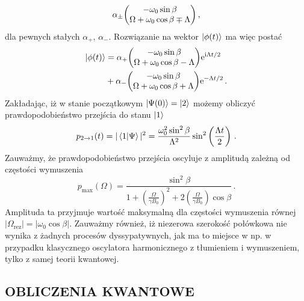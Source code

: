 \documentclass{myclass}
\begin{document}
\begin{itemize}
\begin{equation*}
        \alpha_\pm \mqty( -\omega_0\sin\beta \\ \Omega + \omega_0\cos\beta \mp \Lambda)\,,
    \end{equation*}
    dla pewnych stałych \(\alpha_+\), \(\alpha_-\). Rozwiązanie na wektor \(\ket{\phi(t)}\) ma więc
    postać
    \begin{equation*}
        \begin{split}
            \ket{\phi(t)} &= \alpha_+\mqty(-\omega_0\sin\beta \\ \Omega+\omega_0\cos\beta - \Lambda)\e^{\im\Lambda t/2} \\
            &+ \alpha_- \mqty(-\omega_0\sin\beta \\ \Omega + \omega_0\cos\beta+\Lambda)\e^{-\Lambda t/2}\,.
        \end{split}
    \end{equation*}
    Zakładając, iż w stanie początkowym \(\ket{\Psi(0)} = \ket{2}\) możemy obliczyć
    prawdopodobieństwo przejścia do stanu \(\ket{1}\)
    \begin{equation*}
        p_{2\to1}(t) = |\braket{1}{\Psi}|^2 = \frac{\omega_0^2\sin^2\beta}{\Lambda^2}\sin^2\left(\frac{\Lambda t}{2}\right)\,.
    \end{equation*}
    Zauważmy, że prawdopodobieństwo przejścia oscyluje z amplitudą zależną od częstości wymuszenia
    \begin{equation*}
        p_\text{max}(\Omega) = \frac{\sin^2\beta}{1 + \left(\frac{\Omega}{\gamma B_0}\right)^2 + 2\left(\frac{\Omega}{\gamma B_0}\right) \cos\beta} \,.
    \end{equation*}
    Amplituda ta przyjmuje wartość maksymalną dla częstości wymuszenia równej \(|\Omega_\text{rez}|
    = |\omega_0 \cos\beta|\). Zauważmy również, iż niezerowa szerokość połówkowa nie wynika z
    żadnych procesów dyssypatywnych, jak ma to miejsce w np. w przypadku klasycznego oscylatora
    harmonicznego z tłumieniem i wymuszeniem, tylko z samej teorii kwantowej.

\end{itemize}


\newpage
\subsection{OBLICZENIA KWANTOWE}




%
%
%
%
\end{document}

